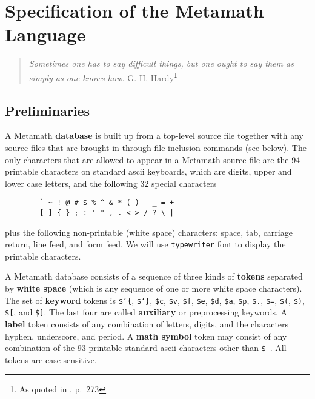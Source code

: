 \section{Specification of the Metamath Language}\label{spec}

\begin{quote}
  {\em Sometimes one has to say difficult things, but one ought to say
them as simply as one knows how.}
    \flushright\sc  G. H. Hardy\footnote{As quoted in
    \cite{deMillo}, p.~273}\\
\end{quote}

\subsection{Preliminaries}\label{spec1}

A Metamath {\bf database} is built up from a top-level source
file together with any source files that are brought in through file inclusion
commands (see below).  The only characters that are allowed to appear in a
Metamath source file are the 94 printable characters on standard {\sc
ascii} keyboards, which are digits, upper and lower
case letters, and the following 32 special characters
\label{spec1chars}

\begin{verbatim}
        ` ~ ! @ # $ % ^ & * ( ) - _ = +
        [ ] { } ; : ' " , . < > / ? \ |
\end{verbatim}
plus the following non-printable (white space) characters: space, tab,
carriage return, line feed, and form feed.  We will use \texttt{typewriter}
font to display the printable characters.

A Metamath database consists of a sequence of three kinds of {\bf
tokens} separated by {\bf white space}
(which is any sequence of one or more white space characters).  The set
of {\bf keyword} tokens is \texttt{\$\char`\{},
\texttt{\$\char`\}}, \texttt{\$c}, \texttt{\$v}, \texttt{\$f},
\texttt{\$e}, \texttt{\$d}, \texttt{\$a}, \texttt{\$p}, \texttt{\$.},
\texttt{\$=}, \texttt{\$(}, \texttt{\$)}, \texttt{\$[}, and
\texttt{\$]}.  The last four are called {\bf auxiliary} or preprocessing keywords.  A {\bf label} token
consists of any combination of letters, digits, and the characters
hyphen, underscore, and period.  A {\bf math symbol}
token may consist of any combination of the 93 printable standard {\sc
ascii} characters other than \texttt{\$}~. All tokens are
case-sensitive.

